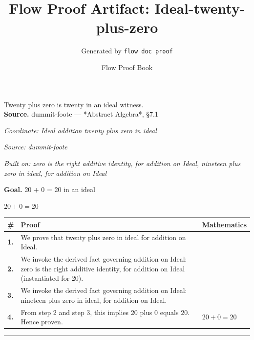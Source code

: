 \documentclass[11pt]{article}
\title{Flow Proof Artifact: Ideal-twenty-plus-zero}
\author{Generated by \texttt{flow doc proof}}
\date{Flow Proof Book}
\theoremstyle{definition}
\begin{document}
\maketitle
Twenty plus zero is twenty in an ideal witness.\\[0.5em]
\textbf{Source.} dummit-foote — *Abstract Algebra*, §7.1\\[0.5em]
\bigskip
{}\par
\smallskip\noindent\textit{Coordinate: Ideal \cdot addition \cdot twenty plus zero in ideal}\par
\smallskip\noindent\textit{Source: dummit-foote}\par
\smallskip\noindent\textit{Built on: zero is the right additive identity, for addition on Ideal, nineteen plus zero in ideal, for addition on Ideal}\par
\medskip
\noindent\textbf{Goal.} 20 + 0 = 20 in an ideal\par
\noindent$\displaystyle 20 + 0 = 20$\par
\medskip
\noindent
\begin{tabular}{@{} >{\raggedright\arraybackslash}p{} >{\raggedright\arraybackslash}p{} >{\raggedleft\arraybackslash}p{} @{}}
\textbf{\#} & \textbf{Proof} & \textbf{Mathematics} \\
\midrule
\textbf{1.} & We prove that twenty plus zero in ideal for addition on Ideal. & \\[0.45em]
\textbf{2.} & We invoke the derived fact governing addition on Ideal: zero is the right additive identity, for addition on Ideal (instantiated for 20). & \\[0.45em]
\textbf{3.} & We invoke the derived fact governing addition on Ideal: nineteen plus zero in ideal, for addition on Ideal. & \\[0.45em]
\textbf{4.} & From step 2 and step 3, this implies 20 plus 0 equals 20. Hence proven. & $\displaystyle 20 + 0 = 20$ \\[0.45em]
\bottomrule
\end{tabular}
\label{thm:Ideal-addition-twenty_plus_zero_in_ideal}
\par\medskip\hrule
\end{document}

